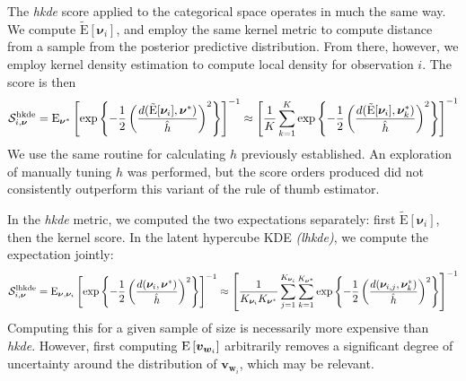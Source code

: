 The \emph{hkde} score applied to the categorical space operates in much the 
    same way.  We compute $\tilde{\text{E}}[\bm{\nu}_i]$, and employ the same 
    kernel metric to compute distance from a sample from the posterior predictive 
    distribution.  From there, however, we employ kernel density estimation
    to compute local density for observation $i$.  The score is then
    \begin{equation}
        \label{score:cat_hkde}
        \mathcal{S}_{i,\bm{\nu}}^{\text{hkde}} = \text{E}_{\bm{\nu}^*}\left[
            \exp\left\lbrace
            -\frac{1}{2}\left(
            \frac{d(\tilde{\text{E}}[\bm{\nu}_i], \bm{\nu}^*)}{\hat{h}}
            \right)^2
            \right\rbrace
            \right]^{-1} \approx \left[\frac{1}{K}\sum_{k = 1}^{K}
                \exp\left\lbrace-\frac{1}{2}\left(
                \frac{d(\tilde{\text{E}}[\bm{\nu}_i],\bm{\nu}_k^*)}{\hat{h}}
                \right)^2\right\rbrace\right]^{-1}
    \end{equation}
We use the same routine for calculating $h$ previously established.  
    An exploration of manually tuning $h$ was performed, but the score orders 
    produced did not consistently outperform this variant of the rule of thumb 
    estimator.

In the \emph{hkde} metric, we computed the two expectations separately: first 
    $\tilde{\text{E}}[\bm{\nu}_i]$, then the kernel score.  In the latent hypercube 
    KDE \emph{(lhkde)}, we compute the expectation jointly:
    \begin{equation}
        \label{score:cat_lhkde}
        \mathcal{S}_{i,\bm{\nu}}^{\text{lhkde}} = \text{E}_{\bm{\nu},\bm{\nu}_i}\left[
        \exp\left\lbrace
        -\frac{1}{2}\left(
        \frac{d(\bm{\nu}_i, \bm{\nu}^*)}{\hat{h}}
        \right)^2
        \right\rbrace
        \right]^{-1} \approx \left[\frac{1}{K_{\bm{\nu}_i}K_{\bm{\nu}^*}}
            \sum_{j = 1}^{K_{\bm{\nu}_i}}\sum_{k = 1}^{K_{\bm{\nu}^*}}
            \exp\left\lbrace-\frac{1}{2}
                \left(\frac{d(\bm{\nu}_{i,j},\bm{\nu}_{k}^*)}{\hat{h}}\right)^2
                \right\rbrace\right]^{-1}
    \end{equation}
    Computing this for a given sample of size is necessarily more expensive 
    than \emph{hkde}.  However, first computing $\text{E}\left[\bm{v}_{\bm{w}_i}\right]$ 
    arbitrarily removes a significant degree of uncertainty around the 
    distribution of $\bm{v}_{\bm{w}_i}$, which may be relevant.

